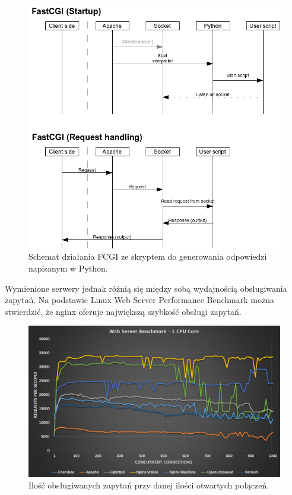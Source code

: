 \documentclass[eng]{mgr}
\begin{document}
			\begin{center}
				\begin{figure}[ht]
					\centering
					\includegraphics[scale=0.7]{flow_fastcgi.png}
					\caption{Schemat działania FCGI ze skryptem do generowania odpowiedzi napisanym w Python. \cite{fcgi}}
				\end{figure}
			\end{center}
		
			Wymienione serwery jednak różnią się między sobą wydajnością obsługiwania zapytań. Na podstawie Linux Web Server Performance Benchmark \cite{webserverbenchmark} można stwierdzić, że nginx oferuje największą szybkość obsługi zapytań.
	
			\begin{center}
				\begin{figure}[ht]
					\centering
					\includegraphics[scale=0.35]{web-server-performance-benchmark-1-cpu-core-1.jpg}
					\caption{Ilość obsługiwanych zapytań przy danej ilości otwartych połączeń. \cite{webserverbenchmark}}
				\end{figure}
			\end{center}
\end{document}
